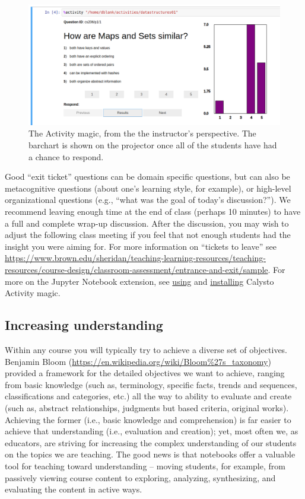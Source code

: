 \documentclass[]{book}
\begin{document}
\begin{figure}
\centering
\includegraphics{images/activity-magic-instructor.png}
\caption{The Activity magic, from the the instructor's perspective. The
barchart is shown on the projector once all of the students have had a
chance to respond.}
\end{figure}

Good ``exit ticket'' questions can be domain specific questions, but can
also be metacognitive questions (about one's learning style, for
example), or high-level organizational questions (e.g., ``what was the
goal of today's discussion?''). We recommend leaving enough time at the
end of class (perhaps 10 minutes) to have a full and complete wrap-up
discussion. After the discussion, you may wish to adjust the following
class meeting if you feel that not enough students had the insight you
were aiming for. For more information on ``tickets to leave'' see
\url{https://www.brown.edu/sheridan/teaching-learning-resources/teaching-resources/course-design/classroom-assessment/entrance-and-exit/sample}.
For more on the Jupyter Notebook extension, see
\href{https://github.com/Calysto/metakernel/blob/master/metakernel/magics/README.md\#activity}{using}
and
\href{https://github.com/Calysto/metakernel\#use-metakernel-magics-in-ipython}{installing}
Calysto Activity magic.

\subsection{Increasing understanding}\label{increasing-understanding}

Within any course you will typically try to achieve a diverse set of
objectives. Benjamin Bloom
(\url{https://en.wikipedia.org/wiki/Bloom\%27s_taxonomy}) provided a
framework for the detailed objectives we want to achieve, ranging from
basic knowledge (such as, terminology, specific facts, trends and
sequences, classifications and categories, etc.) all the way to ability
to evaluate and create (such as, abstract relationships, judgments but
based criteria, original works). Achieving the former (i.e., basic
knowledge and comprehension) is far easier to achieve that understanding
(i.e., evaluation and creation); yet, most often we, as educators, are
striving for increasing the complex understanding of our students on the
topics we are teaching. The good news is that notebooks offer a valuable
tool for teaching toward understanding -- moving students, for example,
from passively viewing course content to exploring, analyzing,
synthesizing, and evaluating the content in active ways.
\end{document}
